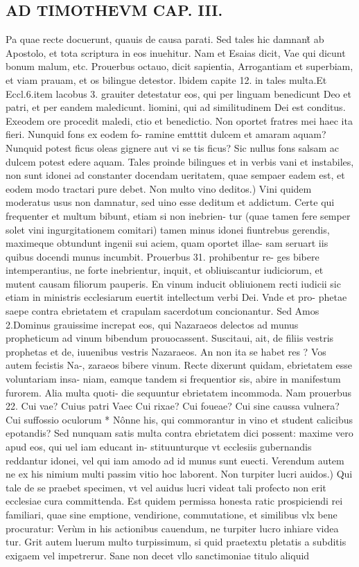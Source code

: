 \documentclass{article}
\begin{document}
\begin{pages}
\section*{AD TIMOTHEVM CAP. III. }
\marginpar{[ p.83 ]}\pstart Pa quae recte docuerunt, quauis de causa parati. Sed tales hic damnant̃ ab Apostolo, et tota scriptura in eos inuehitur. Nam et Esaias dicit, Vae qui dicunt bonum malum, etc. Prouerbus octauo, dicit sapientia, Arrogantiam et superbiam, et viam prauam, et os bilingue detestor. lbidem capite 12. in tales multa.Et Eccl.6.item lacobus 3. grauiter detestatur eos, qui per linguam benedicunt Deo et patri, et per eandem maledicunt. liomini, qui ad similitudinem Dei est conditus. Exeodem ore procedit maledi, ctio et benedictio. Non oportet fratres mei haec ita fieri. Nunquid fons ex eodem fo- ramine emtttit dulcem et amaram aquam? Nunquid potest ficus oleas gignere aut vi se tis ficus? Sic nullus fons salsam ac dulcem potest edere aquam. Tales proinde bilingues et in verbis vani et instabiles, non sunt idonei ad constanter docendam ueritatem, quae sempaer eadem est, et eodem modo tractari pure debet.  \pend\pstart Non multo vino deditos.) Vini quidem moderatus usus non damnatur, sed uino esse deditum et addictum. Certe qui frequenter et multum bibunt, etiam si non inebrien- tur (quae tamen fere semper solet vini ingurgitationem comitari) tamen minus idonei fiuntrebus gerendis, maximeque obtundunt ingenii sui aciem, quam oportet illae- sam seruart iis quibus docendi munus incumbit. Prouerbus 31. prohibentur re- ges bibere intemperantius, ne forte inebrientur, inquit, et obliuiscantur iudiciorum, et mutent causam filiorum pauperis. En vinum inducit obliuionem recti iudicii sic etiam in ministris ecclesiarum euertit intellectum verbi Dei. Vnde et pro- phetae saepe contra ebrietatem et crapulam sacerdotum concionantur. Sed Amos 2.Dominus grauissime increpat eos, qui Nazaraeos delectos ad munus propheticum ad vinum bibendum prouocassent. Suscitaui, ait, de filiis vestris prophetas et de, iuuenibus vestris Nazaraeos. An non ita se habet res ? Vos autem fecistis Na-, zaraeos bibere vinum. Recte dixerunt quidam, ebrietatem esse voluntariam insa- niam, eamque tandem si frequentior sis, abire in manifestum furorem. Alia multa quoti- die sequuntur ebrietatem incommoda. Nam prouerbus 22. Cui vae? Cuius patri Vaec Cui rixae? Cui foueae? Cui sine caussa vulnera? Cui suffossio oculorum * Nônne his, qui commorantur in vino et student calicibus epotandis? Sed nunquam satis multa contra ebrietatem dici possent: maxime vero apud eos, qui uel iam educant in- stituunturque vt ecclesiis gubernandis reddantur idonei, vel qui iam amodo ad id munus sunt euecti. Verendum autem ne ex his nimium multi passim vitio hoc laborent.  \pend\pstart Non turpiter lucri auidos.) Qui tale de se praebet specimen, vt vel auidus lucri videat tali profecto non erit ecclesiae cura committenda. Est quidem permissa honesta ratic prospiciendi rei familiari, quae sine emptione, vendirione, commutatione, et similibus vlx bene procuratur: Verùm in his actionibus cauendum, ne turpiter lucro inhiare videa tur. Grit autem luerum multo turpissimum, si quid praetextu pletatis a subditis exigaem vel impetrerur. Sane non decet vllo sanctimoniae titulo aliquid 
\end{pages}
\end{document}
